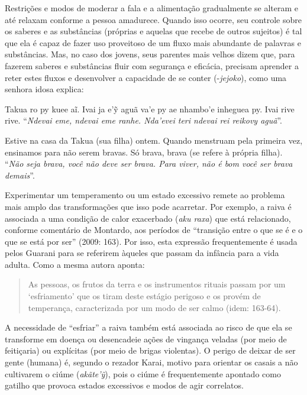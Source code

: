 Restrições e modos de moderar a fala e a alimentação gradualmente se
alteram e até relaxam conforme a pessoa amadurece. Quando isso ocorre,
seu controle sobre os saberes e as substâncias (próprias e aquelas que
recebe de outros sujeitos) é tal que ela é capaz de fazer uso
proveitoso de um fluxo mais abundante de palavras e substâncias. Mas,
no caso dos jovens, seus parentes mais velhos dizem que, para fazerem
saberes e substâncias fluir com segurança e eficácia, precisam aprender
a reter estes fluxos e desenvolver a capacidade de se conter (-\emph{jejoko}),
como uma senhora idosa explica:

\bigskip

\begin{paracol}{2}
\footnotesize
\bigskip
Takua ro py kuee aĩ. Ivai ja e'ỹ aguã va'e py ae nhambo'e inheguea py.
Ivai rive rive. ``\emph{Ndevai eme, ndevai eme ranhe. Nda'evei teri
ndevai rei reikovy aguã}''.

\switchcolumn
Estive na casa da Takua (sua filha) ontem. Quando menstruam pela
primeira vez, ensinamos para não serem bravas. Só brava, brava (se
refere à própria filha). ``\emph{Não seja brava, você não deve ser
brava. Para viver, não é bom você ser brava demais}''.
\end{paracol}

\bigskip

Experimentar um temperamento ou um estado excessivo remete ao problema
mais amplo das transformações que isso pode acarretar. Por exemplo, a
raiva é associada a uma condição de calor exacerbado (\emph{aku raxa}) que
está relacionado, conforme comentário de Montardo, aos períodos de
``transição entre o que se é e o que se está por ser'' (2009: 163). Por
isso, esta expressão frequentemente é usada pelos Guarani para se
referirem àqueles que passam da infância para a vida adulta. Como a
mesma autora aponta: 

\begin{quotation}
\noindent
As pessoas, os frutos da terra e os instrumentos rituais passam por um
‘esfriamento’ que os tiram deste estágio perigoso e os provém de
temperança, caracterizada por um modo de ser calmo (idem: 163-64). 

\end{quotation}
A necessidade de ``esfriar'' a raiva também está associada ao risco de que
ela se transforme em doença ou desencadeie ações de vingança veladas
(por meio de feitiçaria) ou explícitas (por meio de brigas violentas).
O perigo de deixar de ser gente (humana) é, segundo o rezador Karai,
motivo para orientar os casais a não cultivarem o ciúme
(\emph{akãte’ỹ}), pois o ciúme é frequentemente apontado como gatilho
que provoca estados excessivos e modos de agir correlatos. 

